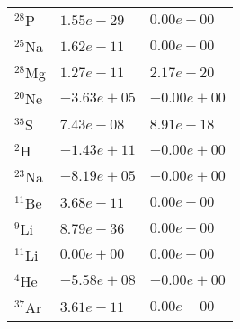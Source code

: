 \begin{tabular}{lll}
 $^{28}$P  & $1.55e-29 $                                                        & $0.00e+00 $                                                                     \\
 $^{25}$Na & $1.62e-11 $                                                        & $0.00e+00 $                                                                     \\
 $^{28}$Mg & $1.27e-11 $                                                        & $2.17e-20 $                                                                     \\
 $^{20}$Ne & $-3.63e+05 $                                                       & $-0.00e+00 $                                                                    \\
 $^{35}$S  & $7.43e-08 $                                                        & $8.91e-18 $                                                                     \\
 $^{2}$H   & $-1.43e+11 $                                                       & $-0.00e+00 $                                                                    \\
 $^{23}$Na & $-8.19e+05 $                                                       & $-0.00e+00 $                                                                    \\
 $^{11}$Be & $3.68e-11 $                                                        & $0.00e+00 $                                                                     \\
 $^{9}$Li  & $8.79e-36 $                                                        & $0.00e+00 $                                                                     \\
 $^{11}$Li & $0.00e+00 $                                                        & $0.00e+00 $                                                                     \\
 $^{4}$He  & $-5.58e+08 $                                                       & $-0.00e+00 $                                                                    \\
 $^{37}$Ar & $3.61e-11 $                                                        & $0.00e+00 $                                                                     \\
\hline
\end{tabular}

